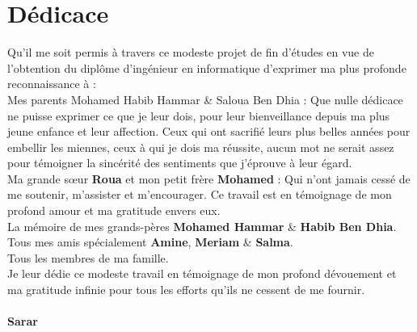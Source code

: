 \chapter*{Dédicace}

\hspace{2cm}
\hspace{2cm}

\hspace{2cm}
\hspace{2cm}

Qu’il me soit permis à travers ce modeste projet de fin d’études en vue de l’obtention du diplôme d’ingénieur en informatique d’exprimer ma plus profonde reconnaissance à : \\

Mes parents Mohamed Habib Hammar \& Saloua Ben Dhia : Que nulle dédicace ne puisse exprimer ce que je leur dois, pour leur bienveillance depuis ma plus jeune enfance et leur affection. Ceux qui ont sacrifié leurs plus belles années pour embellir les miennes, ceux à qui je dois ma réussite, aucun mot ne serait assez pour témoigner la sincérité des sentiments que j’éprouve à leur égard. \\

Ma grande sœur \textbf{Roua} et mon petit frère \textbf{Mohamed} : Qui n’ont jamais cessé de me soutenir, m’assister et m’encourager. Ce travail est en témoignage de mon profond amour et ma gratitude envers eux.\\

La mémoire de mes grands-pères \textbf{Mohamed Hammar} \& \textbf{Habib Ben Dhia}.\\

Tous mes amis spécialement \textbf{Amine}, \textbf{Meriam} \& \textbf{Salma}.\\

Tous les membres de ma famille.\\

Je leur dédie ce modeste travail en témoignage de mon profond dévouement et ma gratitude infinie pour tous les efforts qu'ils ne cessent de me fournir.\\ \ \\



\hspace{15cm}\textbf{Sarar} 